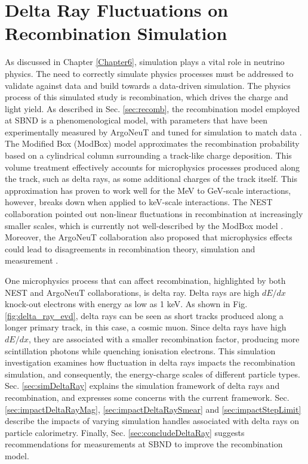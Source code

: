 
\section{Delta Ray Fluctuations on Recombination Simulation}
\label{sec7:delta}

As discussed in Chapter \ref{Chapter6}, simulation plays a vital role in neutrino physics.
The need to correctly simulate physics processes must be addressed to validate against data and build towards a data-driven simulation.
The physics process of this simulated study is recombination, which drives the charge and light yield.                                              
As described in Sec. \ref{sec:recomb}, the recombination model employed at SBND is a phenomenological model, with parameters that have been experimentally measured by ArgoNeuT and tuned for simulation to match data \cite{argoneut_recomb}.
The Modified Box (ModBox) model approximates the recombination probability based on a cylindrical column surrounding a track-like charge deposition.
This volume treatment effectively accounts for microphysics processes produced along the track, such as delta rays, as some additional charges of the track itself.
This approximation has proven to work well for the MeV to GeV-scale interactions, however, breaks down when applied to keV-scale interactions.
The NEST collaboration pointed out non-linear fluctuations in recombination at increasingly smaller scales, which is currently not well-described by the ModBox model \cite{NEST}.   
Moreover, the ArgoNeuT collaboration also proposed that microphysics effects could lead to disagreements in recombination theory, simulation and measurement \cite{argoneut_recomb}.

One microphysics process that can affect recombination, highlighted by both NEST and ArgoNeuT collaborations, is delta ray.
Delta rays are high $dE/dx$ knock-out electrons with energy as low as 1 keV.
As shown in Fig. \ref{fig:delta_ray_evd}, delta rays can be seen as short tracks produced along a longer primary track, in this case, a cosmic muon.                      
Since delta rays have high $dE/dx$, they are associated with a smaller recombination factor, producing more scintillation photons while quenching ionisation electrons.
This simulation investigation examines how fluctuation in delta rays impacts the recombination simulation, and consequently, the energy-charge scales of different particle types.
Sec. \ref{sec:simDeltaRay} explains the simulation framework of delta rays and recombination, and expresses some concerns with the current framework.
Sec. \ref{sec:impactDeltaRayMag}, \ref{sec:impactDeltaRaySmear} and \ref{sec:impactStepLimit} describe the impacts of varying simulation handles associated with delta rays on particle calorimetry.
Finally, Sec. \ref{sec:concludeDeltaRay} suggests recommendations for measurements at SBND to improve the recombination model.             
                                                                                                                       
